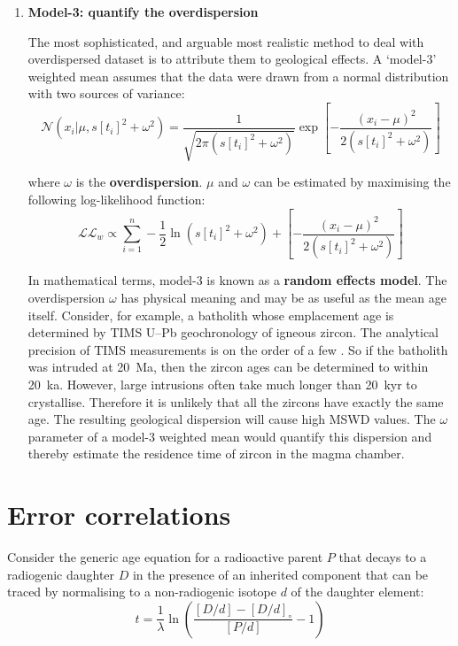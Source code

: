 \begin{refsection}
\begin{enumerate}
\item\textbf{Model-3: quantify the overdispersion}

  The most sophisticated, and arguable most realistic method to deal
  with overdispersed dataset is to attribute them to geological
  effects. A `model-3' weighted mean assumes that the data were drawn
  from a normal distribution with two sources of variance:
  \begin{equation}
    \mathcal{N}(x_i|\mu,s[t_i]^2+\omega^2) =
    \frac{1}{\sqrt{2\pi\left(s[t_i]^2+\omega^2\right)}}
    \exp\!\left[-\frac{(x_i-\mu)^2}{2\left(s[t_i]^2 + \omega^2 \right)}\right]
    \label{eq:overdispersion}
  \end{equation}

\noindent where $\omega$ is the \textbf{overdispersion}. $\mu$ and
$\omega$ can be estimated by maximising the following log-likelihood
function:
  \begin{equation}
    \mathcal{LL}_w \propto \sum\limits_{i=1}^{n}
    - \frac{1}{2}\ln\!\left(s[t_i]^2+\omega^2\right)
    + \left[-\frac{(x_i-\mu)^2}{2\left(s[t_i]^2 + \omega^2 \right)}\right]
    \label{eq:wtdmean-model-3}
  \end{equation}

In mathematical terms, model-3 is known as a \textbf{random effects
  model}. The overdispersion $\omega$ has physical meaning and may be
as useful as the mean age itself. Consider, for example, a batholith
whose emplacement age is determined by TIMS U--Pb geochronology of
igneous zircon. The analytical precision of TIMS measurements is on
the order of a few \textperthousand. So if the batholith was intruded
at 20~Ma, then the zircon ages can be determined to within
20~ka. However, large intrusions often take much longer than 20~kyr to
crystallise. Therefore it is unlikely that all the zircons have
exactly the same age.  The resulting geological dispersion will cause
high MSWD values.  The $\omega$ parameter of a model-3 weighted mean
would quantify this dispersion and thereby estimate the residence time
of zircon in the magma chamber.

\end{enumerate}

\section{Error correlations}
\label{sec:errorcorrelations}

Consider the generic age equation for a radioactive parent $P$
that decays to a radiogenic daughter $D$ in the presence of
an inherited component that can be traced by normalising to
a non-radiogenic isotope $d$ of the daughter element:
\begin{equation}
  t = \frac{1}{\lambda}
  \ln\left(\frac{\left[{D}/{d}\right]-\left[{D}/{d}\right]_\circ}
          {\left[{P}/{d}\right]} - 1\right)
\end{equation}


\end{refsection}
